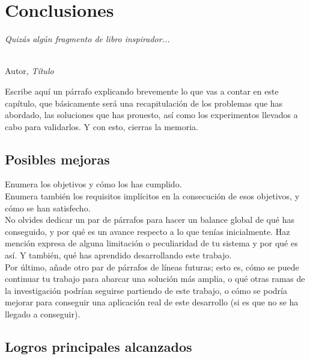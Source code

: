 \chapter{Conclusiones}
\label{cap:capitulo6}

\begin{flushright}
\begin{minipage}[]{10cm}
\emph{Quizás algún fragmento de libro inspirador...}\\
\end{minipage}\\

Autor, \textit{Título}\\
\end{flushright}

\vspace{1cm}

Escribe aquí un párrafo explicando brevemente lo que vas a contar en este capítulo, que básicamente será una recapitulación de los problemas que has abordado, las soluciones que has prouesto, así como los experimentos llevados a cabo para validarlos. Y con esto, cierras la memoria.

\section{Posibles mejoras}

Enumera los objetivos y cómo los has cumplido.\\

Enumera también los requisitos implícitos en la consecución de esos objetivos, y cómo se han satisfecho.\\

No olvides dedicar un par de párrafos para hacer un balance global de qué has conseguido, y por qué es un avance respecto a lo que tenías inicialmente. Haz mención expresa de alguna limitación o peculiaridad de tu sistema y por qué es así. Y también, qué has aprendido desarrollando este trabajo.\\

Por último, añade otro par de párrafos de líneas futuras; esto es, cómo se puede continuar tu trabajo para abarcar una solución más amplia, o qué otras ramas de la investigación podrían seguirse partiendo de este trabajo, o cómo se podría mejorar para conseguir una aplicación real de este desarrollo (si es que no se ha llegado a conseguir).

\section{Logros principales alcanzados}